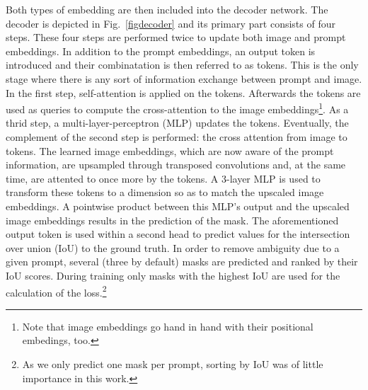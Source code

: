 Both types of embedding are then included into the decoder network. The decoder is depicted in Fig.~\ref{figdecoder} and its primary part consists of four steps. These four steps are performed twice to update both image and prompt embeddings. In addition to the prompt embeddings, an output token is introduced and their combinatation is then referred to as tokens. This is the only stage where there is any sort of information exchange between prompt and image. In the first step, self-attention is applied on the tokens. Afterwards the tokens are used as queries to compute the cross-attention to the image embeddings\footnote{Note that image embeddings go hand in hand with their positional embedings, too.}. As a thrid step, a multi-layer-perceptron (MLP) updates the tokens. Eventually, the complement of the second step is performed: the cross attention from image to tokens. The learned image embeddings, which are now aware of the prompt information, are upsampled through transposed convolutions and, at the same time, are attented to once more by the tokens. A 3-layer MLP is used to transform these tokens to a dimension so as to match the upscaled image embeddings. A pointwise product between this MLP's output and the upscaled image embeddings results in the prediction of the mask. The aforementioned output token is used within a second head to predict values for the intersection over union (IoU) to the ground truth. In order to remove ambiguity due to a given prompt, several (three by default) masks are predicted and ranked by their IoU scores. During training only masks with the highest IoU are used for the calculation of the loss.\footnote{As we only predict one mask per prompt, sorting by IoU was of little importance in this work.} 


